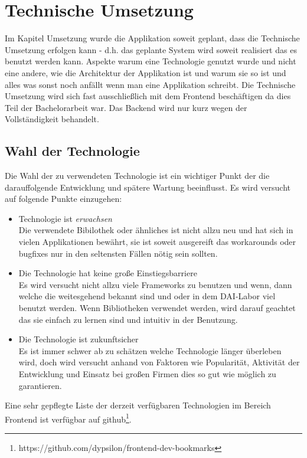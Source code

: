 \documentclass[12pt,twoside]{book}
\begin{document}
\chapter{Technische Umsetzung} 

Im Kapitel Umsetzung wurde die Applikation soweit geplant, dass die Technische Umsetzung erfolgen kann - d.h. das geplante System wird soweit realisiert das es benutzt werden kann. Aspekte warum eine Technologie genutzt wurde und nicht eine andere, wie die Architektur der Applikation ist und warum sie so ist und alles was sonst noch anfällt wenn man eine Applikation schreibt.
Die Technische Umsetzung wird sich fast ausschließlich mit dem Frontend beschäftigen da dies Teil der Bachelorarbeit war. Das Backend wird nur kurz wegen der Vollständigkeit behandelt.

\section*{Wahl der Technologie}

Die Wahl der zu verwendeten Technologie ist ein wichtiger Punkt der die darauffolgende Entwicklung und spätere Wartung beeinflusst. Es wird versucht auf folgende Punkte einzugehen:

\begin{itemize}
  \item Technologie ist \textit{erwachsen} \\
  Die verwendete Bibilothek oder ähnliches ist nicht allzu neu und hat sich in vielen Applikationen bewährt, sie ist soweit ausgereift das workarounds oder bugfixes nur in den seltensten Fällen nötig sein sollten.
  \item Die Technologie hat keine große Einstiegsbarriere \\
  Es wird versucht nicht allzu viele Frameworks zu benutzen und wenn, dann welche die weitesgehend bekannt sind und oder in dem DAI-Labor viel benutzt werden. Wenn Bibliotheken verwendet werden, wird darauf geachtet das sie einfach zu lernen sind und intuitiv in der Benutzung.
  \item Die Technologie ist zukunftsicher \\
  Es ist immer schwer ab zu schätzen welche Technologie länger überleben wird, doch wird versucht anhand von Faktoren wie Popularität, Aktivität der Entwicklung und Einsatz bei großen Firmen dies so gut wie möglich zu garantieren.
\end{itemize}


Eine sehr gepflegte Liste der derzeit verfügbaren Technologien im Bereich Frontend ist verfügbar auf github\footnote{https://github.com/dypsilon/frontend-dev-bookmarks}.
\end{document}
